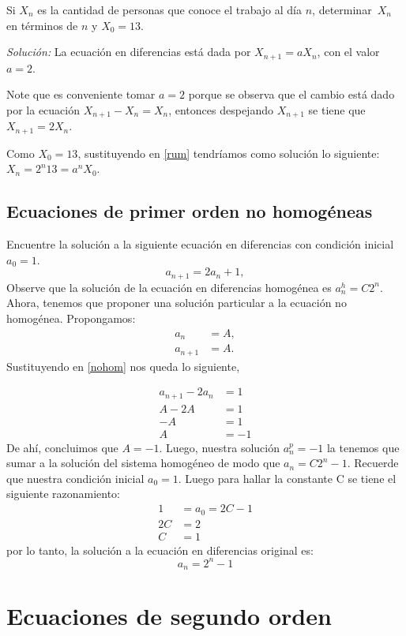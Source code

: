 \documentclass{report}
\theoremstyle{definition}
\begin{document}
Si $X_n$ es la cantidad de personas que conoce el trabajo al día  $n$,
determinar~$X_n$ en términos de $n$ y $X_0=13$.

\textit{Solución:} La ecuación en diferencias está dada por
$X_{n+1}=aX_n$, con el valor~$a=2$.

Note que es conveniente tomar $a=2$ porque se observa que el cambio
está dado por la ecuación $X_{n+1}-X_{n}=X_{n}$, entonces despejando
$X_{n+1}$ se tiene que~$X_{n+1}=2X_n$.

Como $X_0=13$, sustituyendo en \ref{rum} tendríamos como solución lo
siguiente: $X_n=2^n13=a^nX_0$.


\section{Ecuaciones de primer orden no homogéneas}
Encuentre la solución a la siguiente ecuación en diferencias con
condición inicial $a_{0}=1$.
\begin{equation}
  \label{nohom}
  a_{n+1}=2a_{n}+1,
\end{equation}
Observe que la solución de la ecuación en diferencias homogénea es
$a_{n}^h=C2^n$.  Ahora, tenemos que proponer una solución particular a
la ecuación no homogénea.  Propongamos:
\begin{align*}
 a_n&=A,\\
  a_{n+1}&=A.
\end{align*}
Sustituyendo en \ref{nohom} nos queda lo siguiente,

\begin{align*}
  a_{n+1}-2a_{n}&=1\\
  A-2A&=1\\
  -A&=1\\
  A&=-1
\end{align*}
De ahí, concluimos que $A=-1$.  Luego, nuestra solución $a_n^p=-1$ la
tenemos que sumar a la solución del sistema homogéneo de modo que
$a_{n}=C2^n-1$.  Recuerde que nuestra condición inicial
$a_{0}=1$. Luego para hallar la constante C se tiene el siguiente
razonamiento:
\begin{align*}
1&=a_{0}=2C-1\\
2C&=2\\
  C&=1
\end{align*}  
por lo tanto, la solución a la ecuación en diferencias original es:
$$a_{n}=2^n-1$$


\chapter{Ecuaciones de segundo orden}
\end{document}
